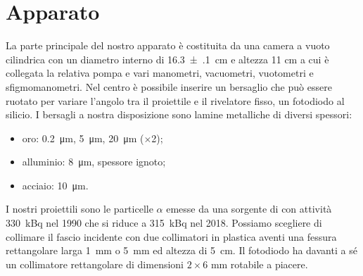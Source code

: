 \section{Apparato}

La parte principale del nostro apparato è costituita da una camera a vuoto cilindrica con un diametro interno di  \SI{16.3(1)}{cm} e altezza 11 cm a cui è collegata la relativa pompa e vari 
manometri, vacuometri, vuotometri e sfigmomanometri. 
Nel centro è possibile inserire un bersaglio che può essere ruotato per variare l'angolo tra il proiettile e il rivelatore fisso, un fotodiodo al silicio.
I bersagli a nostra disposizione sono lamine metalliche di diversi spessori: 
\begin{itemize}

\item oro: \SI{0.2}{\micro m}, \SI{5}{\micro m}, \SI{20}{\micro m} ($\times$2);
\item alluminio: \SI{8}{\micro m}, spessore ignoto;
\item acciaio: \SI{10}{\micro m}.

\end{itemize} 

I nostri proiettili sono le particelle $\alpha$ emesse da una sorgente di \am{} con attività \SI{330}{kBq} nel 1990 che si riduce a \SI{315}{kBq} nel 2018.
Possiamo scegliere di collimare il fascio incidente con due collimatori in plastica aventi una fessura rettangolare larga \SI{1}{mm} o \SI{5}{mm} ed altezza di \SI{5}{cm}.
Il fotodiodo ha davanti a sé un collimatore rettangolare di dimensioni $2\times 6$\! mm rotabile a piacere.
